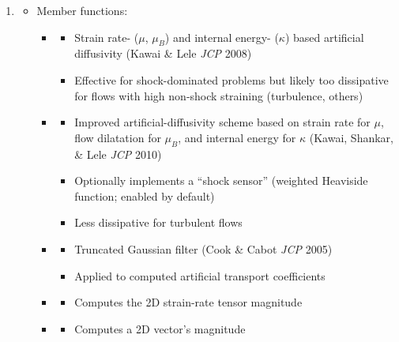 \documentclass[letterpaper,10pt]{article}
\begin{document}
\begin{enumerate}
\item {}
  \vspace{-2mm}\begin{itemize}
  \item \textcolor{lc2}{Member functions:}
    \begin{itemize}
    \item {}
      \begin{itemize}
      \item Strain rate- ($\mu$, $\mu_B$) and internal energy- ($\kappa$) based artificial diffusivity (Kawai \& Lele \emph{JCP} 2008)
      \item Effective for shock-dominated problems but likely too dissipative for flows with high non-shock straining (turbulence, others)
      \end{itemize}
      
    \item {}
      \begin{itemize}
      \item Improved artificial-diffusivity scheme based on strain rate for $\mu$, flow dilatation for $\mu_B$, and internal energy for $\kappa$  (Kawai, Shankar, \& Lele \emph{JCP} 2010)
      \item Optionally implements a ``shock sensor'' (weighted Heaviside function; enabled by default)
      \item Less dissipative for turbulent flows
      \end{itemize}
      
    \item {}
      \begin{itemize}
      \item Truncated Gaussian filter (Cook \& Cabot \emph{JCP} 2005)
      \item Applied to computed artificial transport coefficients
      \end{itemize}
      
    \item {}
      \begin{itemize}
      \item Computes the 2D strain-rate tensor magnitude
      \end{itemize}
      
    \item {}
      \begin{itemize}
      \item Computes a 2D vector's magnitude
      \end{itemize}
      

\end{itemize}
\end{itemize}
\end{enumerate}
\end{document}

